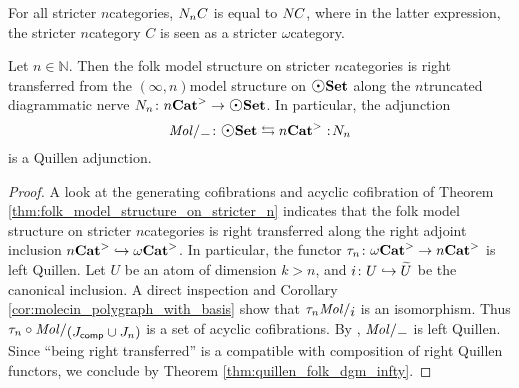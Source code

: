 \begin{rmk}
    For all stricter \( n \)\nbd categories, \( N_{n} C \) is equal to \( N_{} C \), where in the latter expression, the stricter \( n \)\nbd category \( C \) is seen as a stricter \( \omega \)\nbd category.
\end{rmk}

\begin{cor}\label{cor:quillen_folk_dgm_n}
    Let \( n \in \mathbb{N} \).
    Then the folk model structure on stricter \( n \)\nbd categories is right transferred from the \( (\infty, n) \)\nbd model structure on \( \dgmSet \) along the \( n \)\nbd truncated diagrammatic nerve \( \N{n} \colon \snCat{n} \to \dgmSet \).
    In particular, the adjunction 
    \begin{equation*}
        \molecin{-} \colon \dgmSet \leftrightarrows \snCat{n} \cocolon \N{n}
    \end{equation*}
    is a Quillen adjunction.
\end{cor}
\begin{proof}
    A look at the generating cofibrations and acyclic cofibration of Theorem \ref{thm:folk_model_structure_on_stricter_n} indicates that the folk model structure on stricter \( n \)\nbd categories is right transferred along the right adjoint inclusion \( {n\mathbf{Cat}}^> \hookrightarrow {\omega\mathbf{Cat}}^> \).  
    In particular, the functor \( \tau_{n} \colon {\omega\mathbf{Cat}}^> \to {n\mathbf{Cat}}^> \) is left Quillen.
    Let \( U \) be an atom of dimension \( k > n \), and \( i \colon U \hookrightarrow \widetilde{U} \) be the canonical inclusion.
    A direct inspection and Corollary \ref{cor:molecin_polygraph_with_basis} show that \( \trunc{n}\molecin{i} \) is an isomorphism.
    Thus \( \trunc{n} \after \molecin{(\Jcomp \cup \Jn{n})} \) is a set of acyclic cofibrations.
    By \cite[E.2.14]{joyal2008theory}, \( \molecin{-} \) is left Quillen. 
    Since ``being right transferred'' is a compatible with composition of right Quillen functors, we conclude by Theorem \ref{thm:quillen_folk_dgm_infty}.
\end{proof}
